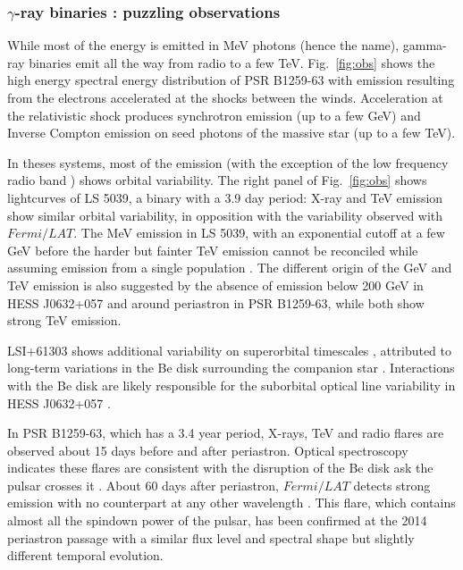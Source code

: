 



\subsubsection {$\gamma$-ray binaries : puzzling observations}
While most of the energy is emitted in MeV photons (hence the name), gamma-ray binaries emit all the way from radio to a few TeV. Fig.~\ref{fig:obs} shows the high energy spectral energy distribution of PSR B1259-63 with emission resulting from the electrons accelerated at the shocks between the winds. Acceleration at the relativistic shock produces synchrotron emission (up to a few GeV) and Inverse Compton emission on seed photons of the massive star (up to a few TeV).   


In theses systems, most of the emission (with the exception of the low frequency radio band \citep{2015MNRAS.451...59M}) shows orbital variability. The right panel of  Fig.~\ref{fig:obs} shows lightcurves of LS 5039, a binary with a 3.9 day period:  X-ray and TeV emission show similar orbital variability, in opposition with the variability observed with $Fermi/LAT$.  The MeV emission in LS 5039, with an exponential cutoff at a few GeV before the harder but fainter TeV emission cannot be reconciled while assuming emission from a single population \citep{2008A&A...477..691D}. The different origin of the GeV and TeV emission is also suggested by the absence of emission below 200 GeV  in HESS J0632+057  \citep{2016arXiv160108216M} and around periastron in PSR B1259-63, while both show strong TeV emission.  

 LSI+61303 shows additional variability on superorbital timescales \citep{2012ApJ...747L..29C}, attributed to long-term variations in the Be disk surrounding the companion star \citep{2015A&A...575L...6P}. Interactions with the Be disk are likely responsible for the suborbital optical line variability in HESS J0632+057 \citep{2015ApJ...804L..32M}. 

In PSR B1259-63, which has a 3.4 year period, X-rays, TeV and radio flares are observed about 15 days before and after periastron. Optical spectroscopy indicates these flares are consistent with the disruption of the Be disk ask the pulsar crosses it \citep{2016MNRAS.455.3674V}.  About 60 days after periastron, $Fermi/LAT$ detects strong emission with no counterpart at any other wavelength \citep{2011ApJ...736L..11A}.  This flare, which contains almost all the spindown power of the pulsar,  has been confirmed at the 2014 periastron passage \citep{2015ApJ...811...68C} with a similar flux level and spectral shape but slightly different temporal evolution.  


